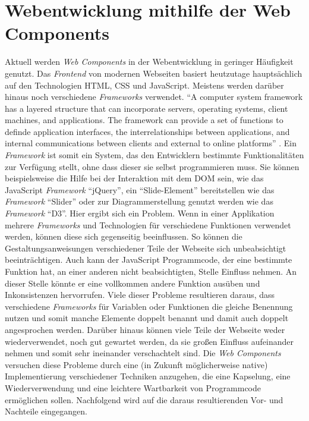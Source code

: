 \documentclass[12pt, paper=a4, bibtotoc, toc=listof, headsepline=true, numbers=endperiod]{scrreprt}
\begin{document}
		\section{Webentwicklung mithilfe der Web Components}
		Aktuell werden \emph{Web Components} in der Webentwicklung in geringer Häufigkeit genutzt. Das \emph{Frontend} von modernen Webseiten basiert heutzutage hauptsächlich auf den Technologien \ac{HTML}, \ac{CSS} und JavaScript. Meistens werden darüber hinaus noch verschiedene \emph{Frameworks} verwendet. \enquote{A computer system framework has a layered structure that can incorporate servers, operating systems, client machines, and applications. The framework can provide a set of functions to definde application interfaces, the interrelationships between applications, and internal communications between clients and external to online platforms} \cite[S.15]{stuart2013roadmap}. Ein \emph{Framework} ist somit ein System, das den Entwicklern bestimmte Funktionalitäten zur Verfügung stellt, ohne dass dieser sie selbst programmieren muss. Sie können beispielsweise die Hilfe bei der Interaktion mit dem \ac{DOM} sein, wie das JavaScript \emph{Framework} \enquote{jQuery}, ein \enquote{Slide-Element} bereitstellen wie das \emph{Framework} \enquote{Slider} oder zur Diagrammerstellung genutzt werden wie das \emph{Framework} \enquote{D3}. Hier ergibt sich ein Problem. Wenn in einer Applikation mehrere \emph{Frameworks} und Technologien für verschiedene Funktionen verwendet werden, können diese sich gegenseitig beeinflussen. So können die Gestaltungsanweisungen verschiedener Teile der Webseite sich unbeabsichtigt beeinträchtigen. Auch kann der  JavaScript Programmcode, der eine bestimmte Funktion hat, an einer anderen nicht beabsichtigten, Stelle Einfluss nehmen. An dieser Stelle könnte er eine vollkommen andere Funktion ausüben und Inkonsistenzen hervorrufen. Viele dieser Probleme resultieren daraus, dass verschiedene \emph{Frameworks} für Variablen oder Funktionen die gleiche Benennung nutzen und somit manche Elemente doppelt benannt und damit auch doppelt angesprochen werden. Darüber hinaus können viele Teile der Webseite weder wiederverwendet, noch gut gewartet werden, da sie großen Einfluss aufeinander nehmen und somit sehr ineinander verschachtelt sind.
		Die \emph{Web Components} versuchen diese Probleme durch eine (in Zukunft möglicherweise native) Implementierung verschiedener Techniken anzugehen, die eine Kapselung, eine Wiederverwendung und eine leichtere Wartbarkeit von Programmcode ermöglichen sollen. Nachfolgend wird auf die daraus resultierenden Vor- und Nachteile eingegangen. 			
\end{document}

